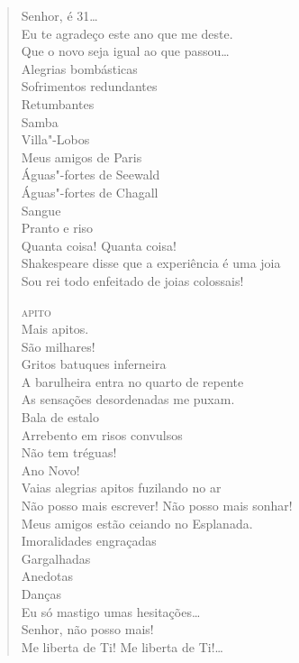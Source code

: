 {\begin{verse}
Senhor, é 31\ldots{}\\
Eu te agradeço este ano que me deste.\\
Que o novo seja igual ao que passou\ldots{}\\
\qquad\qquad\qquad\qquad\quad Alegrias bombásticas\\
\qquad\qquad\qquad\qquad\quad Sofrimentos redundantes\\
\qquad\qquad\qquad\qquad\qquad\qquad\quad Retumbantes\\
\qquad\qquad\qquad\qquad\qquad\quad Samba\\
\qquad\qquad\qquad\qquad\qquad Villa"-Lobos\\
\qquad\qquad\qquad\qquad\quad Meus amigos de Paris\\
\qquad\qquad Águas"-fortes de Seewald\\
\qquad\qquad Águas"-fortes de Chagall\\
\qquad\qquad\qquad\qquad\qquad Sangue\\
\qquad\qquad\qquad\qquad\quad Pranto e riso\\
\qquad\qquad\quad Quanta coisa! Quanta coisa!\\
Shakespeare disse que a experiência é uma joia\\
Sou rei todo enfeitado de joias colossais!

\qquad\qquad \textsc{apito}\\
\qquad Mais apitos.\\
\qquad São milhares!\\
Gritos batuques inferneira\\
A barulheira entra no quarto de repente\\
As sensações desordenadas me puxam.\\
\qquad\qquad\qquad Bala de estalo\\
\qquad\qquad Arrebento em risos convulsos\\
\qquad\qquad Não tem tréguas!\\
\qquad Ano Novo!\\
Vaias alegrias apitos fuzilando no ar\\
Não posso mais escrever! Não posso mais sonhar!\\
Meus amigos estão ceiando no Esplanada.\\
\qquad\qquad Imoralidades engraçadas\\
\qquad\qquad Gargalhadas\\
\qquad\qquad Anedotas\\
\qquad\qquad Danças\\
Eu só mastigo umas hesitações\ldots{}\\
Senhor, não posso mais!\\
Me liberta de Ti! Me liberta de Ti!\ldots{}


\end{verse}}
